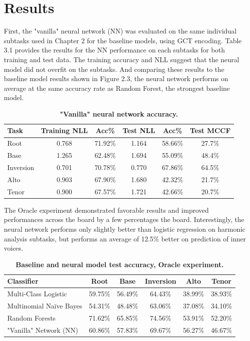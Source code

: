 \documentclass[11pt]{book}
\begin{document}
\section{Results}

First, the "vanilla" neural network (NN) was evaluated on the same individual subtasks used in Chapter 2 for the baseline models, using GCT encoding. Table 3.1 provides the results for the NN performance on each subtasks for both training and test data. The training accuracy and NLL suggest that the neural model did not overfit on the subtasks. And comparing these results to the baseline model results shown in Figure 2.3, the neural network performs on average at the same accuracy rate as Random Forest, the strongest baseline model.

\begin{table}[h]
\begin{center}
\caption[Table caption text]{\textbf{"Vanilla" neural network accuracy.}}
\begin{tabular}{l *{5}{c}}
Task & Training NLL & Acc\% & Test NLL & Acc\% & Test MCCF \\ \hline
Root & 0.768 & 71.92\% & 1.164 & 58.66\% & 27.7\% \\
Base & 1.265 & 62.48\% & 1.694 & 55.09\% & 48.4\% \\
Inversion & 0.701 & 70.78\% & 0.770 & 67.86\% & 64.5\% \\
Alto & 0.903 & 67.90\% & 1.680 & 42.32\% & 21.7\% \\
Tenor & 0.900 & 67.57\% & 1.721 & 42.66\% & 20.7\%
\end{tabular}
\end{center}
\end{table}

The Oracle experiment demonstrated favorable results and improved performances across the board by a few percentages the board. Interestingly, the neural network performs only slightly better than logistic regression on harmonic analysis subtasks, but performs an average of 12.5\% better on prediction of inner voices. \\

\begin{table}[h]
\begin{center}
\caption[Table caption text]{\textbf{Baseline and neural model test accuracy, Oracle experiment. }}
\begin{tabular}{l *{5}{c}}
Classifier & Root & Base & Inversion & Alto & Tenor \\ \hline
Multi-Class Logistic & 59.75\% & 56.49\% & 64.43\% & 38.99\% & 38.93\% \\
Multinomial Na{\"i}ve Bayes & 54.31\% & 48.48\% & 63.06\% & 37.08\% & 34.10\% \\
Random Forests & 71.62\% & 65.85\% & 74.56\% & 53.91\% & 52.20\% \\ \hline
"Vanilla" Network (NN) & 60.86\% & 57.83\% & 69.67\% & 56.27\% & 46.67\%
\end{tabular}
\end{center}
\end{table}
\end{document}
